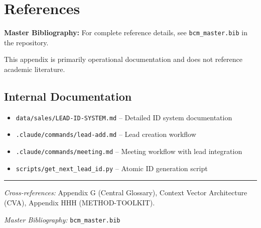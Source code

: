 \section{References}
\label{sec:bn-references}

\begin{tcolorbox}[colback=blue!5!white, colframe=blue!75!black]
\textbf{Master Bibliography:} For complete reference details, see
\texttt{bcm\_master.bib} in the repository.

This appendix is primarily operational documentation and does not reference academic literature.
\end{tcolorbox}

\subsection{Internal Documentation}

\begin{itemize}[nosep]
    \item \texttt{data/sales/LEAD-ID-SYSTEM.md} -- Detailed ID system documentation
    \item \texttt{.claude/commands/lead-add.md} -- Lead creation workflow
    \item \texttt{.claude/commands/meeting.md} -- Meeting workflow with lead integration
    \item \texttt{scripts/get\_next\_lead\_id.py} -- Atomic ID generation script
\end{itemize}

\nocite{bcm_master}


\vspace{1em}
\hrule
\vspace{0.5em}

\noindent\textit{Cross-references:}
Appendix G (Central Glossary),
Context Vector Architecture (CVA),
Appendix HHH (METHOD-TOOLKIT).

\noindent\textit{Master Bibliography:} \texttt{bcm\_master.bib}

